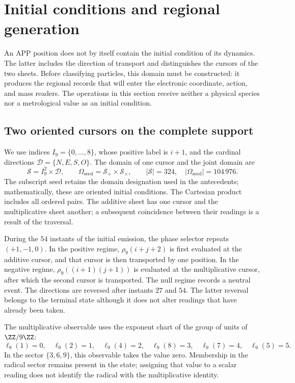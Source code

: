 \section{Initial conditions and regional generation}
\label{vi:reg:seccion}\label{sec:extension}\label{sec:generacion}

An APP position does not by itself contain the initial condition of its
dynamics. The latter includes the direction of transport and distinguishes the cursors
of the two sheets. Before classifying particles, this domain must be
constructed: it produces the regional records that
will enter the electronic coordinate, action, and mass
readers. The operations in this section receive neither a physical species nor
a metrological value as an initial condition.

\subsection{Two oriented cursors on the complete support}

We use indices \(I_9=\{0,\ldots,8\}\), whose positive label is
\(i+1\), and the cardinal directions \(\mathcal D=\{N,E,S,O\}\).
The domain of one cursor and the joint domain are
\begin{equation}
 \mathcal S=I_9^2\times\mathcal D,\qquad
 \Omega_{\mathrm{seed}}=\mathcal S_+\times\mathcal S_\times,
 \qquad |\mathcal S|=324,\quad
 |\Omega_{\mathrm{seed}}|=104\,976.
 \label{eq:semillas}
\end{equation}
The subscript \(\mathrm{seed}\) retains the domain designation used in
the antecedents; mathematically, these are oriented initial
conditions. The Cartesian product includes all ordered pairs.
The additive sheet has one cursor and the multiplicative sheet another; a
subsequent coincidence between their readings is a result of the traversal.

During the \(54\) instants of the initial emission, the phase selector
repeats \((+1,-1,0)\). In the positive regime,
\(\rho_9(i+j+2)\) is first evaluated at the additive cursor, and that
cursor is then transported by one position. In the negative regime,
\(\rho_9((i+1)(j+1))\) is evaluated at the multiplicative cursor, after which
the second cursor is transported. The null regime records a neutral event. The
directions are reversed after instants \(27\) and \(54\).
The latter reversal belongs to the terminal state although it does not alter
readings that have already been taken.

The multiplicative observable uses the exponent chart of the group of
units of \(\ZZ/9\ZZ\):
\[
 \ell_9(1)=0,\quad\ell_9(2)=1,\quad\ell_9(4)=2,\quad
 \ell_9(8)=3,\quad\ell_9(7)=4,\quad\ell_9(5)=5.
\]
In the sector \(\{3,6,9\}\), this observable takes the value zero.
Membership in the radical sector remains present in the state; assigning
that value to a scalar reading does not identify the radical with the multiplicative
identity.

